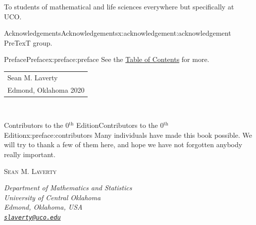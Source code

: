 \documentclass[oneside,10pt,]{book}
\newcommand{\mono}[1]{\texttt{#1}}
\numberwithin{equation}{section}
\newcommand{\contributor}[1]{\parbox{\linewidth}{#1}\par\bigskip}
\newcommand{\contributorname}[1]{\textsc{#1}\\[0.25\baselineskip]}
\newcommand{\contributorinfo}[1]{\hspace*{0.05\linewidth}\parbox{0.95\linewidth}{\textsl{#1}}}
\begin{document}
\null\clearpage
\cleardoublepage
\thispagestyle{empty}
\begin{center}\Large%
To students of mathematical and life sciences everywhere but specifically at UCO.%
\end{center}
\clearpage
\thispagestyle{empty}
\null%
\clearpage
%
%
\typeout{************************************************}
\typeout{************************************************}
%
\begin{acknowledgement}{Acknowledgements}{}{Acknowledgements}{}{}{x:acknowledgement:acknowledgement}
PreTexT group.%
\end{acknowledgement}
%
%
\typeout{************************************************}
\typeout{************************************************}
%
\begin{preface}{Preface}{}{Preface}{}{}{x:preface:preface}
See the \hyperlink{x:book:mathstat}{Table of Contents} for more.%
\nopagebreak\par%
\hfill\begin{tabular}[t]{l@{}}
Sean M. Laverty\\
Edmond, Oklahoma 2020
\end{tabular}\\\par
\end{preface}
%
%
\typeout{************************************************}
\typeout{************************************************}
%
\begin{preface}{Contributors to the 0\(^\mathrm{th}\) Edition}{}{Contributors to the 0\(^\mathrm{th}\) Edition}{}{}{x:preface:contributors}
Many individuals have made this book possible.  We will try to thank a few of them here, and hope we have not forgotten anybody really important.%
\begin{multicols}{2}
\hypertarget{x:contributor:slaverty}{}%
\contributor{%
\contributorname{Sean M. Laverty}%
\contributorinfo{Department of Mathematics and Statistics\\
University of Central Oklahoma\\
Edmond, Oklahoma, USA\\
\mono{\href{mailto:slaverty@uco.edu}{\nolinkurl{slaverty@uco.edu}}}}%
}%
\end{multicols}
\end{preface}
\end{document}
